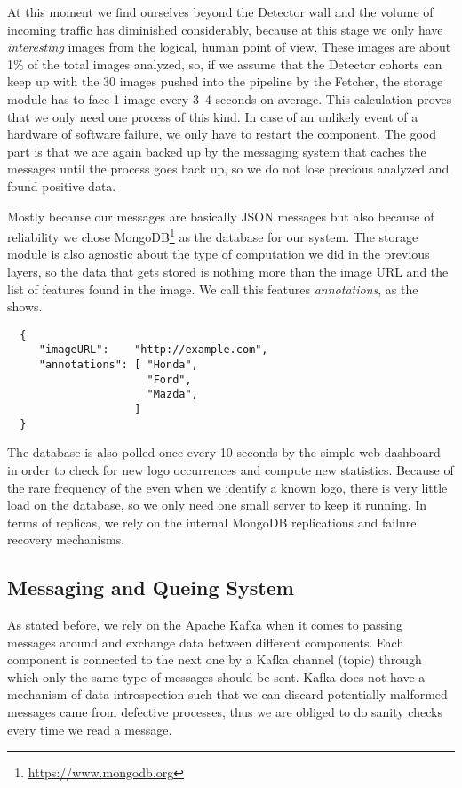 At this moment we find ourselves beyond the Detector wall and the volume of
incoming traffic has diminished considerably, because at this stage we only
have \textit{interesting} images from the logical, human point of view. These
images are about 1\% of the total images analyzed, so, if we assume that the
Detector cohorts can keep up with the 30 images pushed into the pipeline by
the Fetcher, the storage module has to face 1 image every 3--4 seconds on
average. This calculation proves that we only need one process of this kind.
In case of an unlikely event of a hardware of software failure, we only have
to restart the component. The good part is that we are again backed up by the
messaging system that caches the messages until the process goes back up, so
we do not lose precious analyzed and found positive data.

Mostly because our messages are basically JSON messages but also because of
reliability we chose MongoDB\footnote{\url{https://www.mongodb.org}} as the
database for our system. The storage module is also agnostic about the type of
computation we did in the previous layers, so the data that gets stored is
nothing more than the image URL and the list of features found in the image.
We call this features \textit{annotations}, as the
 shows.

\lstset{caption=MongoDB Document,label=lst:mongo-json}
\begin{lstlisting}
  {
     "imageURL":    "http://example.com",
     "annotations": [ "Honda",
                      "Ford",
                      "Mazda",
                    ]
  }
\end{lstlisting}

The database is also polled once every 10 seconds by the simple web dashboard
in order to check for new logo occurrences and compute new statistics. Because
of the rare frequency of the even when we identify a known logo, there is very
little load on the database, so we only need one small server to keep it
running. In terms of replicas, we rely on the internal MongoDB replications
and failure recovery mechanisms.

\subsection{Messaging and Queing System}
\label{sub-sec:q-system}

As stated before, we rely on the Apache Kafka when it comes to passing
messages around and exchange data between different components. Each component
is connected to the next one by a Kafka channel (topic) through which only the
same type of messages should be sent. Kafka does not have a mechanism of data
introspection such that we can discard potentially malformed messages came from
defective processes, thus we are obliged to do sanity checks every time we
read a message.

